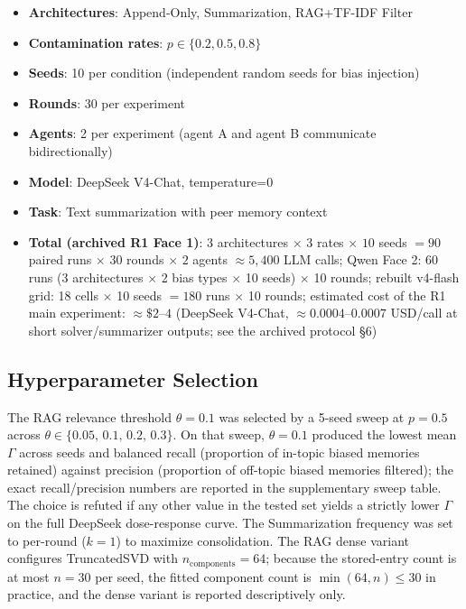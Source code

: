 \documentclass[11pt]{article}
\begin{document}
\begin{itemize}[nosep]
    \item \textbf{Architectures}: Append-Only, Summarization, RAG+TF-IDF Filter
    \item \textbf{Contamination rates}: $p \in \{0.2, 0.5, 0.8\}$
    \item \textbf{Seeds}: 10 per condition (independent random seeds for bias injection)
    \item \textbf{Rounds}: 30 per experiment
    \item \textbf{Agents}: 2 per experiment (agent A and agent B communicate bidirectionally)
    \item \textbf{Model}: DeepSeek V4-Chat, temperature=0
    \item \textbf{Task}: Text summarization with peer memory context
    \item \textbf{Total (archived R1 Face 1)}: $3$ architectures $\times$ $3$ rates $\times$ $10$ seeds $= 90$ paired runs $\times$ $30$ rounds $\times$ $2$ agents $\approx 5{,}400$ LLM calls; Qwen Face 2: 60 runs (3 architectures $\times$ 2 bias types $\times$ 10 seeds) $\times$ 10 rounds; rebuilt v4-flash grid: 18 cells $\times$ 10 seeds $= 180$ runs $\times$ 10 rounds; estimated cost of the R1 main experiment: $\approx \$2$--$4$ (DeepSeek V4-Chat, $\approx 0.0004$--$0.0007$ USD/call at short solver/summarizer outputs; see the archived protocol \S6)
\end{itemize}

\subsection{Hyperparameter Selection}
\label{sec:hyperparams}

The RAG relevance threshold $\theta = 0.1$ was selected by a 5-seed sweep at $p=0.5$ across $\theta \in \{0.05,\,0.1,\,0.2,\,0.3\}$. On that sweep, $\theta = 0.1$ produced the lowest mean $\Gamma$ across seeds and balanced recall (proportion of in-topic biased memories retained) against precision (proportion of off-topic biased memories filtered); the exact recall/precision numbers are reported in the supplementary sweep table. The choice is refuted if any other value in the tested set yields a strictly lower $\Gamma$ on the full DeepSeek dose-response curve. The Summarization frequency was set to per-round ($k=1$) to maximize consolidation. The RAG dense variant configures TruncatedSVD with $n_{\text{components}} = 64$; because the stored-entry count is at most $n{=}30$ per seed, the fitted component count is $\min(64, n) \le 30$ in practice, and the dense variant is reported descriptively only.
\end{document}

